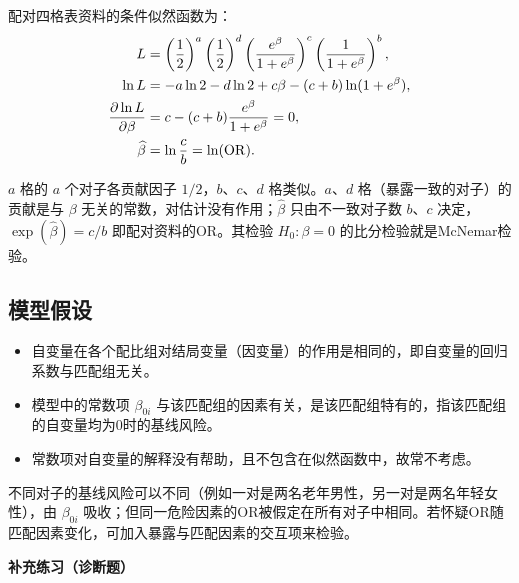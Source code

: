 配对四格表资料的条件似然函数为：
\begin{align*}
L&=\left(\frac12\right)^a\left(\frac12\right)^d
\left(\frac{e^\beta}{1+e^\beta}\right)^c\left(\frac1{1+e^\beta}\right)^b,\\
\ln L&=-a\ln2-d\ln2+c\beta-(c+b)\ln(1+e^\beta),\\
\frac{\partial\ln L}{\partial\beta}&=c-(c+b)\frac{e^\beta}{1+e^\beta}=0,\\
\widehat\beta&=\ln\frac cb=\ln(\operatorname{OR}).
\end{align*}
\begin{annotation}$a$ 格的 $a$ 个对子各贡献因子 $1/2$，$b$、$c$、$d$ 格类似。$a$、$d$ 格（暴露一致的对子）的贡献是与 $\beta$ 无关的常数，对估计没有作用；$\widehat\beta$ 只由不一致对子数 $b$、$c$ 决定，$\exp(\widehat\beta)=c/b$ 即配对资料的OR。其检验 $H_0:\beta=0$ 的比分检验就是McNemar检验。\end{annotation}
\subsection{模型假设}
\begin{itemize}
\item 自变量在各个配比组对结局变量（因变量）的作用是相同的，即自变量的回归系数与匹配组无关。
\item 模型中的常数项 $\beta_{0i}$ 与该匹配组的因素有关，是该匹配组特有的，指该匹配组的自变量均为0时的基线风险。
\item 常数项对自变量的解释没有帮助，且不包含在似然函数中，故常不考虑。
\end{itemize}
\begin{annotation}
不同对子的基线风险可以不同（例如一对是两名老年男性，另一对是两名年轻女性），由 $\beta_{0i}$ 吸收；但同一危险因素的OR被假定在所有对子中相同。若怀疑OR随匹配因素变化，可加入暴露与匹配因素的交互项来检验。
\end{annotation}
\par{}\noindent\textbf{补充练习（诊断题）}
